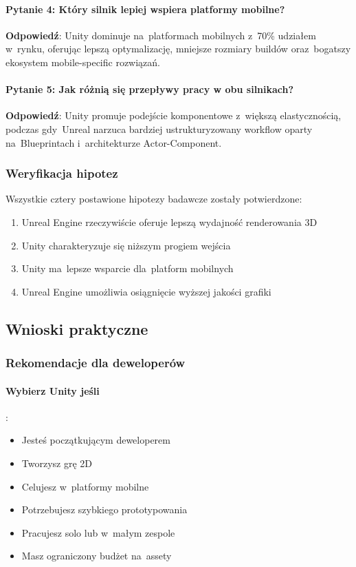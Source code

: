 \paragraph{Pytanie 4: Który silnik lepiej wspiera platformy mobilne?}

\textbf{Odpowiedź}: Unity dominuje na~platformach mobilnych z~70\% udziałem w~rynku, oferując lepszą optymalizację, mniejsze rozmiary buildów oraz~bogatszy ekosystem mobile-specific rozwiązań.

\paragraph{Pytanie 5: Jak różnią się przepływy pracy w obu silnikach?}

\textbf{Odpowiedź}: Unity promuje podejście komponentowe z~większą elastycznością, podczas gdy~Unreal narzuca bardziej ustrukturyzowany workflow oparty na~Blueprintach i~architekturze Actor-Component.

\subsubsection{Weryfikacja hipotez}

Wszystkie cztery postawione hipotezy badawcze zostały potwierdzone:

\begin{enumerate}
    \item Unreal Engine rzeczywiście oferuje lepszą wydajność renderowania 3D
    \item Unity charakteryzuje się niższym progiem wejścia
    \item Unity ma~lepsze wsparcie dla~platform mobilnych
    \item Unreal Engine umożliwia osiągnięcie wyższej jakości grafiki
\end{enumerate}

\subsection{Wnioski praktyczne}

\subsubsection{Rekomendacje dla deweloperów}

\paragraph{Wybierz Unity jeśli}:
\begin{itemize}
    \item Jesteś początkującym deweloperem
    \item Tworzysz grę 2D
    \item Celujesz w~platformy mobilne
    \item Potrzebujesz szybkiego prototypowania
    \item Pracujesz solo lub w~małym zespole
    \item Masz ograniczony budżet na~assety
\end{itemize}


